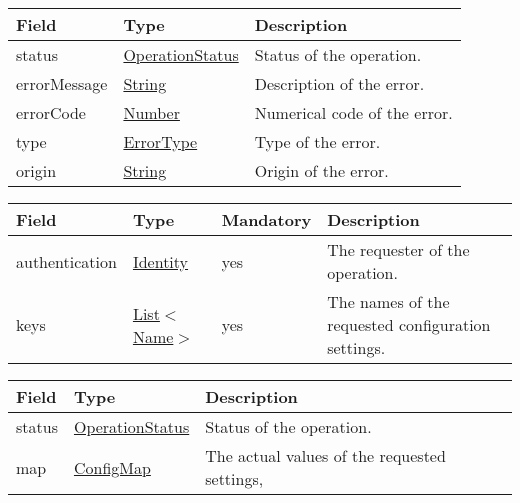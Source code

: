 \documentclass[a4paper]{arrowhead}
\newcommand{\pref}[1]{{\textcolor{ArrowheadGrey}{\hyperref[sec:model:primitives:#1]{#1}}}}
\begin{document}
\begin{table}[ht!]
\begin{tabularx}{\textwidth}{| p{4.25cm} | p{3.5cm} | X |} \hline
\rowcolor{gray!33} Field & Type      & Description \\ \hline
status & \pref{OperationStatus} & Status of the operation. \\ \hline
errorMessage & \pref{String} & Description of the error. \\ \hline
errorCode &\pref{Number}  & Numerical code of the error. \\ \hline
type & \pref{ErrorType} & Type of the error. \\ \hline
origin & \pref{String} & Origin of the error. \\ \hline
\end{tabularx}
\end{table}

\label{sec:model:ConfigRequest}
 
\begin{table}[ht!]
\begin{tabularx}{\textwidth}{| p{3cm} | p{3cm} | p{2cm} | X |} \hline
\rowcolor{gray!33} Field & Type & Mandatory & Description \\ \hline
authentication & \hyperref[sec:model:Identity]{Identity} & yes & The requester of the operation. \\ \hline
keys & \pref{List}$<$\pref{Name}$>$ & yes & The names of the requested configuration settings. \\ \hline
\end{tabularx}
\end{table}

\label{sec:model:ConfigResponse}

\begin{table}[ht!]
\begin{tabularx}{\textwidth}{| p{4.25cm} | p{3.5cm} | X |} \hline
\rowcolor{gray!33} Field & Type      & Description \\ \hline
status & \pref{OperationStatus} & Status of the operation. \\ \hline
map & \hyperref[sec:model:ConfigMap]{ConfigMap} & The actual values of the requested settings, \\ \hline
\end{tabularx}
\end{table}

\label{sec:model:Metadata}
\end{document}
